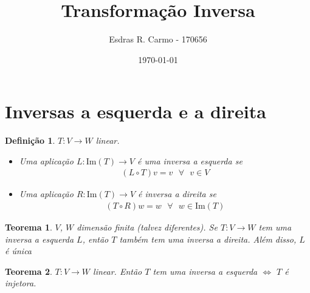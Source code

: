 \documentclass{article}
\author{Esdras R. Carmo - 170656}
\title{Transformação Inversa}
\date{\today}
\newcommand{\imagem}[1] {\text{Im} \left( #1 \right)}
\newcommand{\deffunc}[3] {#1: #2 \longrightarrow #3}
\newtheorem{theorem}{Teorema}[section]
\newtheorem{definition}{Definição}[section]
\begin{document}
    \maketitle
    
    \section{Inversas a esquerda e a direita}
        \begin{definition}
            $\deffunc{T}{V}{W}$ linear.

            \begin{itemize}
                \item Uma aplicação $\deffunc{L}{\imagem{T}}{V}$ é uma inversa
                    a esquerda se \begin{align*}(L \circ T) v = v\text{ } \forall\text{ }v \in V\end{align*}
                \item Uma aplicação $\deffunc{R}{\imagem{T}}{V}$ é inversa a direita se 
                    \begin{align*}(T \circ R) w = w\text{ }\forall\text{ }w \in \imagem{T}\end{align*}
            \end{itemize}
        \end{definition}

        \begin{theorem}
            $V$, $W$ dimensão finita (talvez diferentes). Se $\deffunc{T}{V}{W}$ tem uma inversa
            a esquerda $L$, então $T$ também tem uma inversa a direita. Além disso, $L$ é única
        \end{theorem}
        
        \begin{theorem}
            $\deffunc{T}{V}{W}$ linear. Então $T$ tem uma inversa a esquerda $\Leftrightarrow$ $T$ é injetora.
        \end{theorem}
\end{document}
